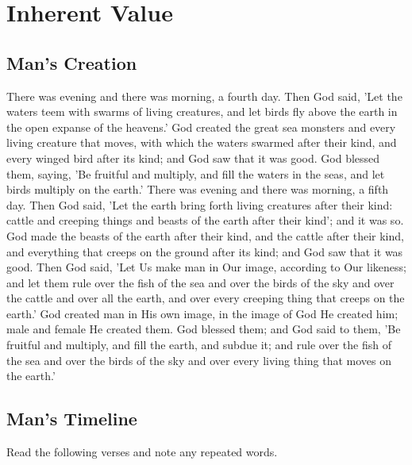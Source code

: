 \chapter{Inherent Value}

\section{Man's Creation}
\begin{scripture}[Gen 1:19--28]
        \vs[19]There was evening and there was morning, a fourth day.
        Then God said, 'Let the waters teem with swarms of living creatures, and let birds fly above the earth in the open expanse of the heavens.'
        God created the great sea monsters and every living creature that moves, with which the waters swarmed after their kind, and every winged bird after its kind; and God saw that it was good.
        God blessed them, saying, 'Be fruitful and multiply, and fill the waters in the seas, and let birds multiply on the earth.'
        There was evening and there was morning, a fifth day.
        Then God said, 'Let the earth bring forth living creatures after their kind: cattle and creeping things and beasts of the earth after their kind'; and it was so.
        God made the beasts of the earth after their kind, and the cattle after their kind, and everything that creeps on the ground after its kind; and God saw that it was good.
        Then God said, 'Let Us make man in Our image, according to Our likeness; and let them rule over the fish of the sea and over the birds of the sky and over the cattle and over all the earth, and over every creeping thing that creeps on the earth.'
        God created man in His own image, in the image of God He created him; male and female He created them.
        God blessed them; and God said to them, 'Be fruitful and multiply, and fill the earth, and subdue it; and rule over the fish of the sea and over the birds of the sky and over every living thing that moves on the earth.'
\end{scripture}



\newpage
\section{Man's Timeline}
Read the following verses and note any repeated words. 
\vspace{2\baselineskip}

